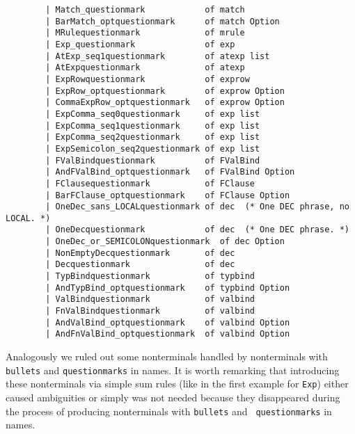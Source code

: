 {\small
\begin{verbatim}
        | Match_questionmark            of match
        | BarMatch_optquestionmark      of match Option
        | MRulequestionmark             of mrule
        | Exp_questionmark              of exp
        | AtExp_seq1questionmark        of atexp list
        | AtExpquestionmark             of atexp
        | ExpRowquestionmark            of exprow
        | ExpRow_optquestionmark        of exprow Option
        | CommaExpRow_optquestionmark   of exprow Option
        | ExpComma_seq0questionmark     of exp list
        | ExpComma_seq1questionmark     of exp list
        | ExpComma_seq2questionmark     of exp list
        | ExpSemicolon_seq2questionmark of exp list
        | FValBindquestionmark          of FValBind
        | AndFValBind_optquestionmark   of FValBind Option
        | FClausequestionmark           of FClause 
        | BarFClause_optquestionmark    of FClause Option
        | OneDec_sans_LOCALquestionmark of dec  (* One DEC phrase, no LOCAL. *)
        | OneDecquestionmark            of dec  (* One DEC phrase. *)
        | OneDec_or_SEMICOLONquestionmark  of dec Option
        | NonEmptyDecquestionmark       of dec
        | Decquestionmark               of dec
        | TypBindquestionmark           of typbind
        | AndTypBind_optquestionmark    of typbind Option
        | ValBindquestionmark           of valbind
        | FnValBindquestionmark         of valbind
        | AndValBind_optquestionmark    of valbind Option
        | AndFnValBind_optquestionmark  of valbind Option
\end{verbatim}}

  \noindent Analogously we ruled out some nonterminals handled by
  nonterminals with {\tt bullets} and {\tt questionmarks} in names. It
  is worth remarking that introducing these nonterminals via simple
  sum rules (like in the first example for {\tt Exp}) either caused
  ambiguities or simply was not needed because they disappeared during
  the process of producing nonterminals with {\tt bullets} and {\tt
  questionmarks} in names.

